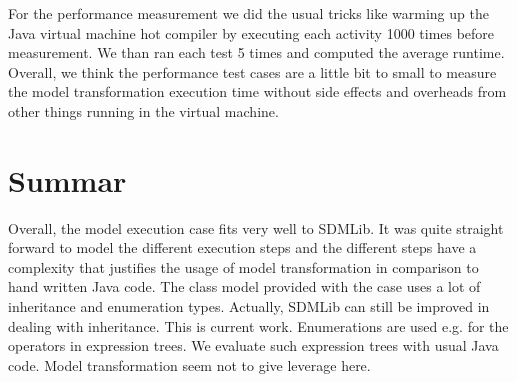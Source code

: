 \documentclass[submission,copyright,creativecommons]{eptcs}
\begin{document}
For the performance measurement we did the usual tricks like warming up the Java virtual machine hot compiler by executing each activity 1000 times before measurement. We than ran each test 5 times and computed the average runtime. Overall, we think the performance test cases are a little bit to small to measure the model transformation execution time without side effects and overheads from other things running in the virtual machine.  


\section{Summar}
\label{sec:summary}

Overall, the model execution case fits very well to SDMLib. It was quite straight forward to 
model the different execution steps and the different steps have a complexity that justifies the usage of model transformation in comparison to hand written Java code. The class model provided with the case uses a lot of inheritance and enumeration types. Actually, SDMLib can still be improved in dealing with inheritance. This is current work. Enumerations are used e.g. for the operators in expression trees. We evaluate such expression trees with usual Java code. Model transformation seem not to give leverage here. 


  
\end{document}
